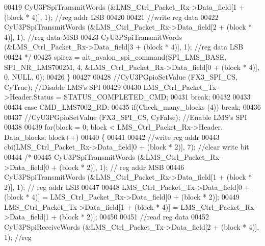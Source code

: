 \begin{DoxyCode}
00419 \textcolor{comment}{                        CyU3PSpiTransmitWords (&LMS\_Ctrl\_Packet\_Rx->Data\_field[1 + (block * 4)], 1); //reg
       addr LSB}
00420 \textcolor{comment}{}
00421 \textcolor{comment}{                        //write reg data}
00422 \textcolor{comment}{                        CyU3PSpiTransmitWords (&LMS\_Ctrl\_Packet\_Rx->Data\_field[2 + (block * 4)], 1); //reg
       data MSB}
00423 \textcolor{comment}{                        CyU3PSpiTransmitWords (&LMS\_Ctrl\_Packet\_Rx->Data\_field[3 + (block * 4)], 1); //reg
       data LSB}
00424 \textcolor{comment}{                        */}
00425                         spirez = alt_avalon_spi_command(SPI_LMS_BASE, 
      SPI_NR_LMS7002M, 4, &LMS\_Ctrl\_Packet\_Rx->Data_field[0 + (block * 4)], 0, NULL, 0);
00426                     \}
00427 
00428                     \textcolor{comment}{//CyU3PGpioSetValue (FX3\_SPI\_CS, CyTrue); //Disable LMS's SPI}
00429 
00430                     LMS\_Ctrl\_Packet\_Tx->Header.Status = STATUS_COMPLETED_CMD;
00431                 \textcolor{keywordflow}{break};
00432 
00433 
00434                 \textcolor{keywordflow}{case} CMD_LMS7002_RD:
00435                     \textcolor{keywordflow}{if}(Check_many_blocks (4)) \textcolor{keywordflow}{break};
00436 
00437                     \textcolor{comment}{//CyU3PGpioSetValue (FX3\_SPI\_CS, CyFalse); //Enable LMS's SPI}
00438 
00439                     \textcolor{keywordflow}{for}(block = 0; block < LMS\_Ctrl\_Packet\_Rx->Header.
      Data_blocks; block++)
00440                     \{
00441 
00442                         \textcolor{comment}{//write reg addr}
00443                         cbi(LMS\_Ctrl\_Packet\_Rx->Data_field[0 + (block * 2)], 7);  \textcolor{comment}{//clear write bit}
00444                         \textcolor{comment}{/*}
00445 \textcolor{comment}{                          CyU3PSpiTransmitWords (&LMS\_Ctrl\_Packet\_Rx->Data\_field[0 + (block * 2)], 1); //
      reg addr MSB}
00446 \textcolor{comment}{                          CyU3PSpiTransmitWords (&LMS\_Ctrl\_Packet\_Rx->Data\_field[1 + (block * 2)], 1); //
      reg addr LSB}
00447 \textcolor{comment}{}
00448 \textcolor{comment}{                        LMS\_Ctrl\_Packet\_Tx->Data\_field[0 + (block * 4)] = LMS\_Ctrl\_Packet\_Rx->Data\_field[0
       + (block * 2)];}
00449 \textcolor{comment}{                        LMS\_Ctrl\_Packet\_Tx->Data\_field[1 + (block * 4)] = LMS\_Ctrl\_Packet\_Rx->Data\_field[1
       + (block * 2)];}
00450 \textcolor{comment}{}
00451 \textcolor{comment}{                        //read reg data}
00452 \textcolor{comment}{                        CyU3PSpiReceiveWords (&LMS\_Ctrl\_Packet\_Tx->Data\_field[2 + (block * 4)], 1); //reg
}
\end{DoxyCode}
